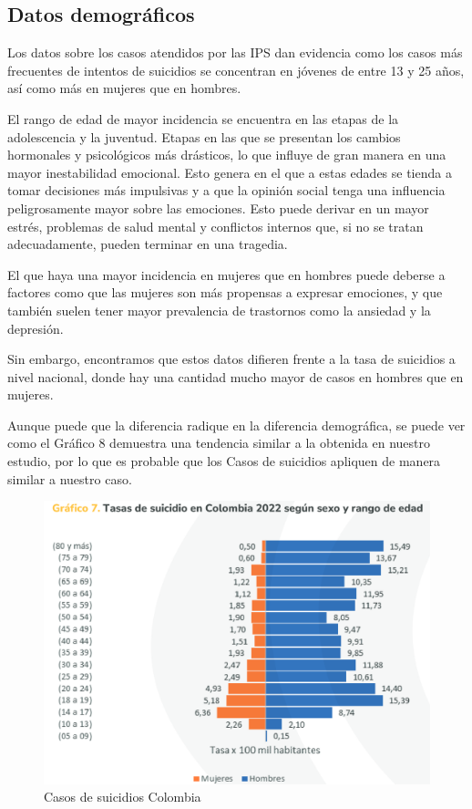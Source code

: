 \documentclass[
]{article}
\begin{document}
\subsection{Datos demográficos}\label{datos-demogruxe1ficos-1}

Los datos sobre los casos atendidos por las IPS dan evidencia como los
casos más frecuentes de intentos de suicidios se concentran en jóvenes
de entre 13 y 25 años, así como más en mujeres que en hombres.

El rango de edad de mayor incidencia se encuentra en las etapas de la
adolescencia y la juventud. Etapas en las que se presentan los cambios
hormonales y psicológicos más drásticos, lo que influye de gran manera
en una mayor inestabilidad emocional. Esto genera en el que a estas
edades se tienda a tomar decisiones más impulsivas y a que la opinión
social tenga una influencia peligrosamente mayor sobre las emociones.
Esto puede derivar en un mayor estrés, problemas de salud mental y
conflictos internos que, si no se tratan adecuadamente, pueden terminar
en una tragedia.

El que haya una mayor incidencia en mujeres que en hombres puede deberse
a factores como que las mujeres son más propensas a expresar emociones,
y que también suelen tener mayor prevalencia de trastornos como la
ansiedad y la depresión.

Sin embargo, encontramos que estos datos difieren frente a la tasa de
suicidios a nivel nacional, donde hay una cantidad mucho mayor de casos
en hombres que en mujeres.

Aunque puede que la diferencia radique en la diferencia demográfica, se
puede ver como el Gráfico 8 demuestra una tendencia similar a la
obtenida en nuestro estudio, por lo que es probable que los Casos de
suicidios apliquen de manera similar a nuestro caso.

\begin{figure}
\centering
\includegraphics{suicidios.png}
\caption{Casos de suicidios Colombia}
\end{figure}
\end{document}
